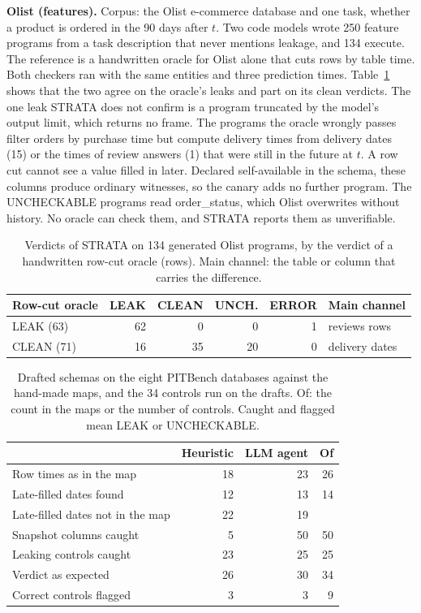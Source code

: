 \documentclass[10pt,conference]{IEEEtran}
\newcommand{\tool}{STRATA}
\begin{document}
\textbf{Olist (features).} Corpus: the Olist e-commerce database and one
task, whether a product is ordered in the 90 days after $t$. Two code models
wrote 250 feature programs from a task description that never mentions
leakage, and 134 execute. The reference is a handwritten oracle for Olist
alone that cuts rows by table time. Both checkers ran with the same entities and
three prediction times. Table~\ref{tab:olist} shows that the two agree on
the oracle's leaks and part on its clean verdicts. The one leak \tool{}
does not confirm is a program truncated by the model's output limit, which
returns no frame. The programs the oracle wrongly passes filter orders by
purchase time but compute delivery times from delivery dates (15) or the
times of review answers (1) that were still in the future at $t$. A row
cut cannot see a value filled in later. Declared self-available in the
schema, these columns produce ordinary witnesses, so the canary adds no
further program. The UNCHECKABLE programs read
order\_status, which Olist overwrites without history. No oracle
can check them, and \tool{} reports them as unverifiable.

\begin{table}[t]
\centering\footnotesize
\setlength{\tabcolsep}{4pt}
\caption{Verdicts of \tool{} on 134 generated Olist programs, by the
verdict of a handwritten row-cut oracle (rows). Main channel: the table or
column that carries the difference.}
\label{tab:olist}
\begin{tabular}{@{}lrrrrl@{}}
\toprule
Row-cut oracle & LEAK & CLEAN & UNCH. & ERROR & Main channel \\
\midrule
LEAK (63)  & 62 & 0  & 0  & 1 & reviews rows \\
CLEAN (71) & 16 & 35 & 20 & 0 & delivery dates \\
\bottomrule
\end{tabular}
\end{table}

\begin{table}[t]
\centering\footnotesize
\setlength{\tabcolsep}{4pt}
\caption{Drafted schemas on the eight PITBench databases against the
hand-made maps, and the 34 controls run on the drafts. Of: the count in the
maps or the number of controls. Caught and flagged mean LEAK or
UNCHECKABLE.}
\label{tab:init}
\begin{tabular}{@{}lrrr@{}}
\toprule
& Heuristic & LLM agent & Of \\
\midrule
Row times as in the map            & 18 & 23 & 26 \\
Late-filled dates found            & 12 & 13 & 14 \\
Late-filled dates not in the map   & 22 & 19 & \\
Snapshot columns caught            & 5  & 50 & 50 \\
\midrule
Leaking controls caught            & 23 & 25 & 25 \\
Verdict as expected                & 26 & 30 & 34 \\
Correct controls flagged           & 3  & 3  & 9 \\
\bottomrule
\end{tabular}
\end{table}
\end{document}

